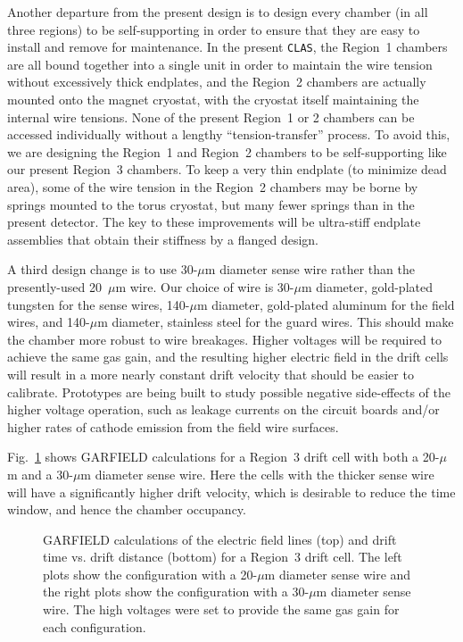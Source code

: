 Another departure from the present design is to design every chamber (in 
all three regions) to be self-supporting in order to ensure that they are 
easy to install and remove for maintenance.  In the present {\tt CLAS}, the 
Region~1 chambers are all bound together into a single unit in order to 
maintain the wire tension without excessively thick endplates, and the 
Region~2 chambers are actually mounted onto the magnet cryostat, with the 
cryostat itself maintaining the internal wire tensions.  None of the present 
Region~1 or 2 chambers can be accessed individually without a lengthy 
``tension-transfer'' process.  To avoid this, we are designing the Region~1 
and Region~2 chambers to be self-supporting like our present Region~3 
chambers.  To keep a very thin endplate (to minimize dead area), some of the 
wire tension in the Region~2 chambers may be borne by springs mounted to the 
torus cryostat, but many fewer springs than in the present detector.  The 
key to these improvements will be ultra-stiff endplate assemblies that 
obtain their stiffness by a flanged design.  

A third design change is to use 30-$\mu$m diameter sense wire rather than 
the presently-used 20~$\mu$m wire.  Our choice of wire is 30-$\mu$m diameter, 
gold-plated tungsten for the sense wires, 140-$\mu$m diameter, gold-plated 
aluminum for the field wires, and 140-$\mu$m diameter, stainless steel for
the guard wires.   This should make the chamber more robust to wire 
breakages.  Higher voltages will be required to achieve the same gas gain, 
and the resulting higher electric field in the drift cells will result in 
a more nearly constant drift velocity that should be easier to calibrate.
Prototypes are being built to study possible negative side-effects of the 
higher voltage operation, such as leakage currents on the circuit boards 
and/or higher rates of cathode emission from the field wire surfaces.

Fig.~\ref{garfield} shows GARFIELD calculations for a Region~3 drift cell
with both a 20-$\mu$m and a 30-$\mu$m diameter sense wire.  Here the
cells with the thicker sense wire will have a significantly higher drift 
velocity, which is desirable to reduce the time window, and hence the 
chamber occupancy.

\begin{figure}[ht]
\vspace{12.0cm}
\caption{\small{GARFIELD calculations of the electric field lines (top)
and drift time vs. drift distance (bottom) for a Region~3 drift cell.  The 
left plots show the configuration with a 20-$\mu$m diameter sense wire and 
the right plots show the configuration with a 30-$\mu$m diameter sense wire.
The high voltages were set to provide the same gas gain for each
configuration.}}
\label{garfield}
\end{figure}
 
